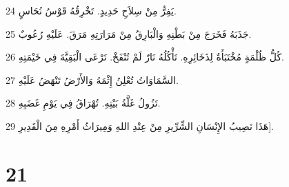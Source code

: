 \par 24 يَفِرُّ مِنْ سِلاَحِ حَدِيدٍ. تَخْرِقُهُ قَوْسُ نُحَاسٍ.
\par 25 جَذَبَهُ فَخَرَجَ مِنْ بَطْنِهِ وَالْبَارِقُ مِنْ مَرَارَتِهِ مَرَقَ. عَلَيْهِ رُعُوبٌ.
\par 26 كُلُّ ظُلْمَةٍ مُخْتَبَأَةٌ لِذَخَائِرِهِ. تَأْكُلُهُ نَارٌ لَمْ تُنْفَخْ. تَرْعَى الْبَقِيَّةَ فِي خَيْمَتِهِ.
\par 27 السَّمَاوَاتُ تُعْلِنُ إِثْمَهُ وَالأَرْضُ تَنْهَضُ عَلَيْهِ.
\par 28 تَزُولُ غَلَّةُ بَيْتِهِ. تُهْرَاقُ فِي يَوْمِ غَضَبِهِ.
\par 29 هَذَا نَصِيبُ الإِنْسَانِ الشِّرِّيرِ مِنْ عِنْدِ اللهِ وَمِيرَاثُ أَمْرِهِ مِنَ الْقَدِيرِ].

\chapter{21}

